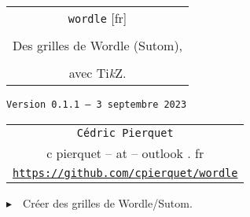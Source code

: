 \documentclass[french,a4paper,11pt]{article}
\def\TPversion{0.1.1}
\def\TPdate{3 septembre 2023}
\begin{document}
\setlength{\aweboxleftmargin}{0.07\linewidth}
\setlength{\aweboxcontentwidth}{0.93\linewidth}
\setlength{\aweboxvskip}{8pt}

\pagestyle{fancy}

\thispagestyle{empty}

\vspace{2cm}

\begin{center}
	\begin{minipage}{0.75\linewidth}
	\begin{tcolorbox}[colframe=yellow,colback=yellow!15]
		\begin{center}
			\begin{tabular}{c}
				{\Huge \texttt{wordle} [fr]}\\
				\\
				{\LARGE Des grilles de Wordle (Sutom),} \\
				\\
				{\LARGE avec \textsf{Ti\textit{k}Z}.} \\
			\end{tabular}
			
			\bigskip
			
			{\small \texttt{Version \TPversion{} -- \TPdate}}
		\end{center}
	\end{tcolorbox}
\end{minipage}
\end{center}

\begin{center}
	\begin{tabular}{c}
	\texttt{Cédric Pierquet}\\
	{\ttfamily c pierquet -- at -- outlook . fr}\\
	\texttt{\url{https://github.com/cpierquet/wordle}}
\end{tabular}
\end{center}

\vspace{0.25cm}

{$\blacktriangleright$~~Créer des grilles de Wordle/Sutom\footnotemark{}.}

\vspace{0.25cm}
\end{document}
